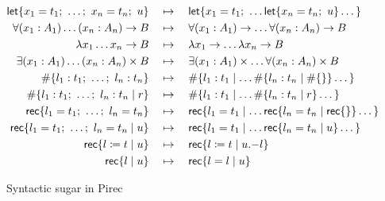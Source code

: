 \begin{figure}
  \begin{align*}
    \operatorname{\mathsf{let}} \{ x_1 = t_1;\ \dots;\ x_n = t_n;\ u \}
     & \quad\mapsto\quad
    \operatorname{\mathsf{let}} \{ x_1 = t_1;\ \dots \operatorname{\mathsf{let}} \{ x_n = t_n;\ u \} \dots \}
    \\
    \forall (x_1 : A_1) \dots (x_n : A_n) \to B
     & \quad\mapsto\quad
    \forall (x_1 : A_1) \to \dots \forall (x_n : A_n) \to B
    \\
    \lambda x_1 \dots x_n \to B
     & \quad\mapsto\quad
    \lambda x_1 \to \dots \lambda x_n \to B
    \\
    \exists (x_1 : A_1) \dots (x_n : A_n) \times B
     & \quad\mapsto\quad
    \exists (x_1 : A_1) \times \dots \forall (x_n : A_n) \times B
    \\
    \# \{ l_1 : t_1;\ \dots;\ l_n : t_n \}
     & \quad\mapsto\quad
    \# \{ l_1 : t_1 \mid \dots \# \{ l_n : t_n \mid \# \{ \} \} \dots \}
    \\
    \# \{ l_1 : t_1;\ \dots;\ l_n : t_n \mid r \}
     & \quad\mapsto\quad
    \# \{ l_1 : t_1 \mid \dots \# \{ l_n : t_n \mid r \} \dots \}
    \\
    \operatorname{\mathsf{rec}} \{ l_1 = t_1;\ \dots;\ l_n = t_n \}
     & \quad\mapsto\quad
    \operatorname{\mathsf{rec}} \{ l_1 = t_1 \mid \dots
    \operatorname{\mathsf{rec}} \{ l_n = t_n \mid \operatorname{\mathsf{rec}} \{ \} \} \dots \}
    \\
    \operatorname{\mathsf{rec}} \{ l_1 = t_1;\ \dots;\ l_n = t_n \mid u \}
     & \quad\mapsto\quad
    \operatorname{\mathsf{rec}} \{ l_1 = t_1 \mid \dots
    \operatorname{\mathsf{rec}} \{ l_n = t_n \mid u \} \dots \}
    \\
    \operatorname{\mathsf{rec}} \{ l \coloneqq t \mid u \}
     & \quad\mapsto\quad
    \operatorname{\mathsf{rec}} \{ l \coloneqq t \mid u \mathord{.-} l \}
    \\
    \operatorname{\mathsf{rec}} \{ l \mid u \}
     & \quad\mapsto\quad
    \operatorname{\mathsf{rec}} \{ l = l \mid u \}
  \end{align*}
  \caption{Syntactic sugar in Pirec}\label{fig:sugar}
\end{figure}

